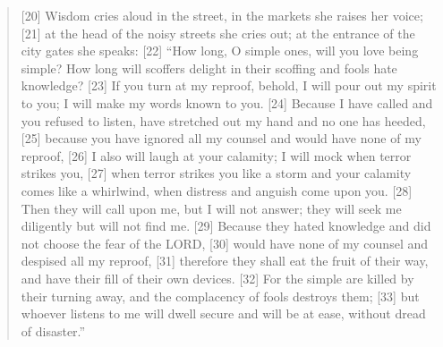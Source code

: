 \begin{quote}
        [20] Wisdom cries aloud in the street,
        in the markets she raises her voice;
    [21] at the head of the noisy streets she cries out;
        at the entrance of the city gates she speaks:
    [22] “How long, O simple ones, will you love being simple?
    How long will scoffers delight in their scoffing
        and fools hate knowledge?
    [23] If you turn at my reproof,
    behold, I will pour out my spirit to you;
        I will make my words known to you.
    [24] Because I have called and you refused to listen,
        have stretched out my hand and no one has heeded,
    [25] because you have ignored all my counsel
        and would have none of my reproof,
    [26] I also will laugh at your calamity;
        I will mock when terror strikes you,
    [27] when terror strikes you like a storm
        and your calamity comes like a whirlwind,
        when distress and anguish come upon you.
    [28] Then they will call upon me, but I will not answer;
        they will seek me diligently but will not find me.
    [29] Because they hated knowledge
        and did not choose the fear of the LORD,
    [30] would have none of my counsel
        and despised all my reproof,
    [31] therefore they shall eat the fruit of their way,
        and have their fill of their own devices.
    [32] For the simple are killed by their turning away,
        and the complacency of fools destroys them;
    [33] but whoever listens to me will dwell secure
        and will be at ease, without dread of disaster.”
  \end{quote}
